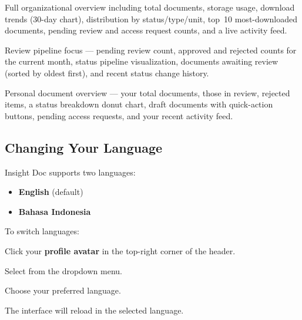 \begin{description}[leftmargin=18pt, style=nextline]
  \item[\ugRole{Admin} / \ugRole{Manager} Dashboard]
    Full organizational overview including total documents,
    storage usage, download trends (30-day chart), distribution
    by status/type/unit, top~10 most-downloaded documents,
    pending review and access request counts, and a live
    activity feed.

  \item[\ugRole{Reviewer} Dashboard]
    Review pipeline focus --- pending review count, approved and
    rejected counts for the current month, status pipeline
    visualization, documents awaiting review (sorted by oldest
    first), and recent status change history.

  \item[\ugRole{Staff} Dashboard]
    Personal document overview --- your total documents, those
    in review, rejected items, a status breakdown donut chart,
    draft documents with quick-action buttons, pending access
    requests, and your recent activity feed.
\end{description}

\subsection{Changing Your Language}

Insight Doc supports two languages:

\begin{itemize}[leftmargin=18pt]
  \item \textbf{English} (default)
  \item \textbf{Bahasa Indonesia}
\end{itemize}

To switch languages:

\begin{ugSteps}
  \item Click your \textbf{profile avatar} in the top-right
        corner of the header.
  \item Select  from the dropdown menu.
  \item Choose your preferred language.
  \item The interface will reload in the selected language.
\end{ugSteps}

